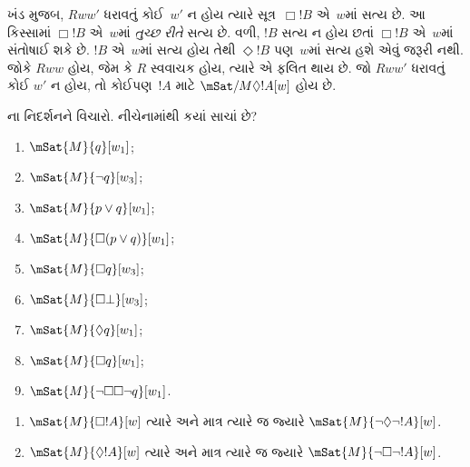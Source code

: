 ખંડ મુજબ, $Rww'$ ધરાવતું
કોઈ~$w'$ ન હોય ત્યારે સૂત્ર~$\Box
!B$ એ~$w$માં સત્ય છે. આ કિસ્સામાં $\Box !B$
એ~$w$માં \emph{તુચ્છ રીતે} સત્ય છે. વળી,
$!B$ સત્ય ન હોય છતાં $\Box !B$ એ~$w$માં સંતોષાઈ શકે છે.
$!B$ એ~$w$માં સત્ય હોય તેથી $\Diamond !B$ પણ~$w$માં
સત્ય હશે એવું જરૂરી નથી. જોકે $Rww$ હોય, જેમ કે
$R$ સ્વવાચક હોય, ત્યારે એ ફલિત થાય છે. જો $Rww'$
ધરાવતું કોઈ $w'$ ન હોય, તો કોઈપણ~$!A$ માટે
$\mSat/{M}{\Diamond !A}[w]$ હોય છે.

\begin{prob}
  ના નિદર્શનને વિચારો.
  નીચેનામાંથી કયાં સાચાં છે?
    \begin{enumerate}
    \item $\mSat{M}{q}[w_1]$;
    \item $\mSat{M}{\lnot q}[w_3]$;
    \item $\mSat{M}{p \lor q}[w_1]$;
    \item $\mSat{M}{\Box (p \lor q)}[w_1]$;
    \item $\mSat{M}{\Box q}[w_3]$;
    \item $\mSat{M}{\Box \bot}[w_3]$;
    \item $\mSat{M}{\Diamond q}[w_1]$;
    \item $\mSat{M}{\Box q}[w_1]$;
    \item $\mSat{M}{\lnot \Box\Box \lnot q}[w_1]$.
    \end{enumerate}
\end{prob}

\begin{prop}
  \begin{enumerate}
  \item $\mSat{M}{\Box !A}[w]$ ત્યારે અને માત્ર ત્યારે જ જ્યારે $\mSat{M}{\lnot\Diamond\lnot !A}[w]$.
  \item $\mSat{M}{\Diamond !A}[w]$ ત્યારે અને માત્ર ત્યારે જ જ્યારે $\mSat{M}{\lnot\Box\lnot !A}[w]$.
  \end{enumerate}
\end{prop}

